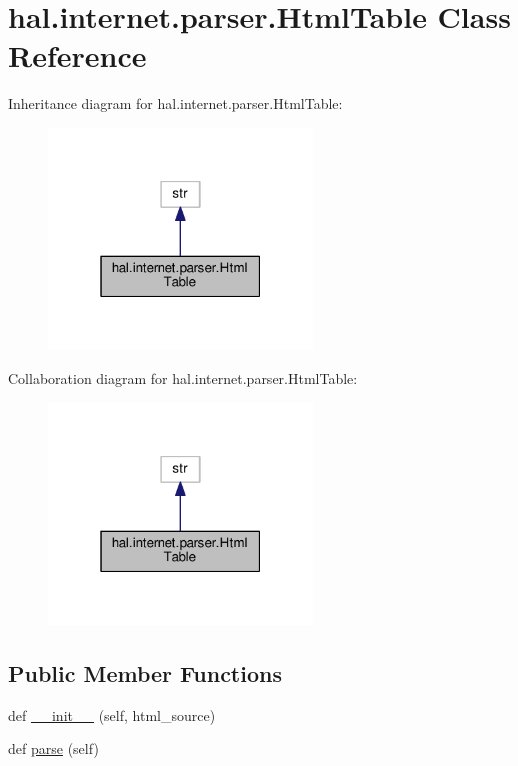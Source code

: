 \hypertarget{classhal_1_1internet_1_1parser_1_1_html_table}{}\section{hal.\+internet.\+parser.\+Html\+Table Class Reference}
\label{classhal_1_1internet_1_1parser_1_1_html_table}


Inheritance diagram for hal.\+internet.\+parser.\+Html\+Table\+:
\nopagebreak
\begin{figure}[H]
\begin{center}
\leavevmode
\includegraphics[width=199pt]{classhal_1_1internet_1_1parser_1_1_html_table__inherit__graph}
\end{center}
\end{figure}


Collaboration diagram for hal.\+internet.\+parser.\+Html\+Table\+:
\nopagebreak
\begin{figure}[H]
\begin{center}
\leavevmode
\includegraphics[width=199pt]{classhal_1_1internet_1_1parser_1_1_html_table__coll__graph}
\end{center}
\end{figure}
\subsection*{Public Member Functions}
\begin{DoxyCompactItemize}
\item 
def \hyperlink{classhal_1_1internet_1_1parser_1_1_html_table_a5bcf5b773113fd62eb6b5319372c5e6b}{\+\_\+\+\_\+init\+\_\+\+\_\+} (self, html\+\_\+source)
\item 
def \hyperlink{classhal_1_1internet_1_1parser_1_1_html_table_addcc7238344dce5f6f71426ae03ce362}{parse} (self)
\end{DoxyCompactItemize}

